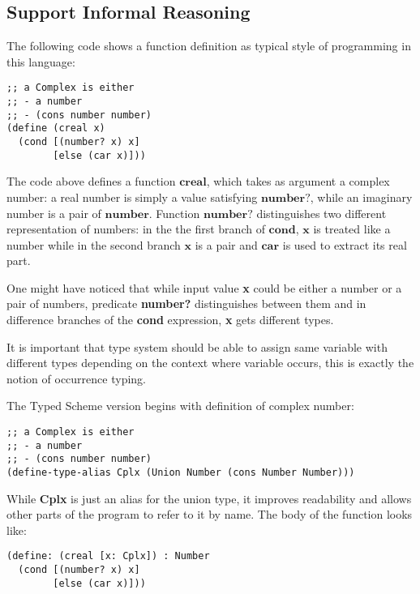
\subsection{Support Informal Reasoning}

The following code shows a function definition as typical style of programming in this language:

\begin{verbatim}
;; a Complex is either
;; - a number
;; - (cons number number)
(define (creal x)
  (cond [(number? x) x]
        [else (car x)]))
\end{verbatim}

The code above defines a function $\textbf{creal}$, which takes as argument
a complex number: a real number is simply a value satisfying $\textbf{number?}$,
while an imaginary number is a pair of $\textbf{number}$.
Function $\textbf{number?}$ distinguishes two different representation of numbers:
in the the first branch of $\textbf{cond}$, $\textbf{x}$ is treated like a number
while in the second branch $\textbf{x}$ is a pair and $\textbf{car}$ is used
to extract its real part.

One might have noticed that
while input value \textbf{x} could be either a number or a pair of numbers,
predicate \textbf{number?} distinguishes between them and
in difference branches of the \textbf{cond} expression, \textbf{x} gets different types.

It is important that type system should be able to assign same variable with different
types depending on the context where variable occurs, this is exactly the notion of
occurrence typing.

The Typed Scheme version begins with definition of complex number:

\begin{verbatim}
;; a Complex is either
;; - a number
;; - (cons number number)
(define-type-alias Cplx (Union Number (cons Number Number)))
\end{verbatim}

While \textbf{Cplx} is just an alias for the union type, it improves readability
and allows other parts of the program to refer to it by name.
The body of the function looks like:

\begin{verbatim}
(define: (creal [x: Cplx]) : Number
  (cond [(number? x) x]
        [else (car x)]))
\end{verbatim}

